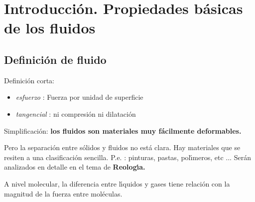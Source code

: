 
\chapter{Introducción. Propiedades básicas de los fluidos}

\section{Definición de fluido}

Definición corta:



\begin{itemize}
	\item \textit{esfuerzo} : Fuerza por unidad de superficie
	
	\item \textit{tangencial} : ni compresión ni dilatación
\end{itemize}


Simplificaci\'on: \textbf{los fluidos son materiales muy f\'acilmente deformables.}

\bigskip

Pero la separaci\'on entre s\'olidos y fluidos no est\'a clara. Hay materiales
que se resiten a una clasificaci\'on sencilla. P.e. : pinturas, pastas, pol\'{\i}meros,
etc ... Ser\'an analizados en detalle en el tema de \textbf{Reolog\'{\i}a.}


A nivel molecular, la diferencia entre l\'{\i}quidos y gases tiene relaci\'on con la magnitud de
la fuerza entre mol\'eculas.


